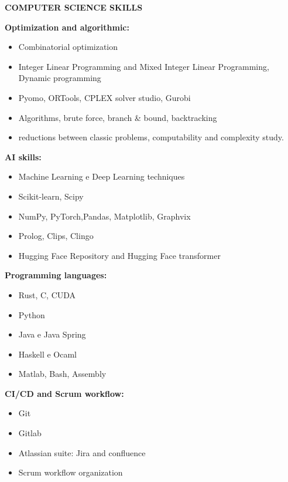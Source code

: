 \documentclass[11pt]{article}
\begin{document}
\vspace{8mm}

\textbf{COMPUTER SCIENCE SKILLS}

\textbf{Optimization and algorithmic:}
\begin{itemize}[noitemsep, topsep=0pt, partopsep=0pt, parsep=0pt]
    \item Combinatorial optimization
    \item Integer Linear Programming and Mixed Integer Linear Programming, Dynamic programming
    \item Pyomo, ORTools, CPLEX solver studio, Gurobi
    \item Algorithms, brute force, branch \& bound, backtracking
    \item reductions between classic problems, computability and complexity study.
\end{itemize}


\textbf{AI skills:}
\begin{itemize}[noitemsep, topsep=0pt, partopsep=0pt, parsep=0pt]
    \item Machine Learning e Deep Learning techniques
    \item Scikit-learn, Scipy
    \item NumPy, PyTorch,Pandas, Matplotlib, Graphvix
    \item Prolog, Clips, Clingo
    \item Hugging Face Repository and Hugging Face transformer
\end{itemize}


\textbf{Programming languages:}
\begin{itemize}[noitemsep, topsep=0pt, partopsep=0pt, parsep=0pt]
    \item Rust, C, CUDA
    \item Python
    \item Java e Java Spring
    \item Haskell e Ocaml
    \item Matlab, Bash, Assembly
\end{itemize}    


\textbf{CI/CD and Scrum workflow:}
\begin{itemize}[noitemsep, topsep=0pt, partopsep=0pt, parsep=0pt]
    \item Git
    \item Gitlab
    \item Atlassian suite: Jira and confluence
    \item Scrum workflow organization
\end{itemize}
\end{document}
